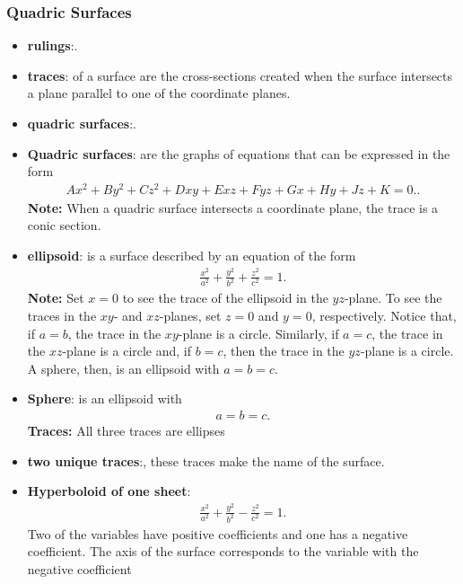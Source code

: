 \documentclass{report}
\begin{document}
    \subsubsection{Quadric Surfaces}
    \begin{itemize}
    \item \textbf{rulings}:.
    \item \textbf{traces}: of a surface are the cross-sections created when the surface intersects a plane parallel to one of the coordinate planes.
    \item \textbf{quadric surfaces}:.
    \item \textbf{Quadric surfaces}: are the graphs of equations that can be expressed in the form
        \begin{align*}
            Ax^2 + By^2 + Cz^2 + Dxy + Exz + Fyz + Gx + Hy + Jz + K = 0.
        .\end{align*}
        \textbf{Note:} When a quadric surface intersects a coordinate plane, the trace is a conic section.
    \item \textbf{ellipsoid}: is a surface described by an equation of the form
        \begin{align*}
            \frac{x^{2}}{a^{2}} + \frac{y^{2}}{b^{2}} + \frac{z^{2}}{c^{2}} = 1
        .\end{align*}
        \textbf{Note:} Set $x=0$ to see the trace of the ellipsoid in the $yz$-plane. To see the traces in the $xy$- and $xz$-planes, set $z=0$ and $y=0$, respectively. Notice that, if $a=b$, the trace in the $xy$-plane is a circle. Similarly, if $a=c$, the trace in the $xz$-plane is a circle and, if $b=c$, then the trace in the $yz$-plane is a circle. A sphere, then, is an ellipsoid with $a=b=c$.
        \bigbreak \noindent 
    \item \textbf{Sphere}: is an ellipsoid with
        \begin{align*}
            a=b=c
        .\end{align*}
        \textbf{Traces:} All three traces are ellipses
    \item \textbf{two unique traces}:, these traces make the name of the surface.
    \item \textbf{Hyperboloid of one sheet}:
        \begin{align*}
            \frac{x^{2}}{a^{2}} + \frac{y^{2}}{b^{2}} - \frac{z^{2}}{c^{2}} = 1
        .\end{align*}
        Two of the variables have positive coefficients and one has a negative coefficient. The axis of the surface corresponds to the variable with the negative coefficient

\end{itemize}
\end{document}
